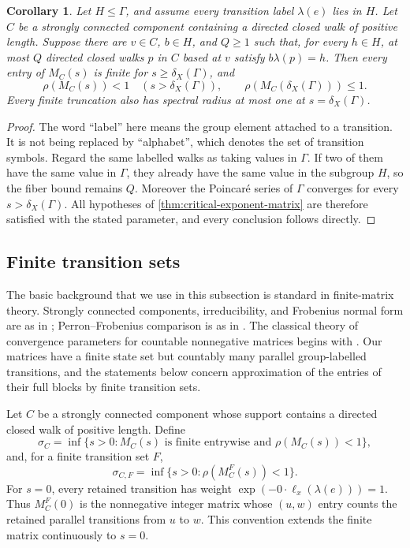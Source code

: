\documentclass[11pt]{article}
\newtheorem{corollary}[corollary]{Corollary}
\theoremstyle{definition}
\begin{document}
\begin{corollary}
\label{cor:finite-state-subgroup}
Let $H\le\Gamma$, and assume every transition label $\lambda(e)$ lies in $H$.  Let $C$ be a
strongly connected component containing a directed closed walk of positive length.  Suppose
there are $v\in C$, $b\in H$, and $Q\ge1$ such that, for every $h\in H$, at most $Q$
directed closed walks $p$ in $C$ based at $v$ satisfy $b\lambda(p)=h$.  Then every
entry of $M_C(s)$ is finite for $s\ge\delta_X(\Gamma)$, and
\[
 \rho(M_C(s))<1\quad(s>\delta_X(\Gamma)),
 \qquad
 \rho(M_C(\delta_X(\Gamma)))\le1.
\]
Every finite truncation also has spectral radius at most one at
$s=\delta_X(\Gamma)$.
\end{corollary}

\begin{proof}
The word ``label'' here means the group element attached to a transition. It is not being
replaced by ``alphabet'', which denotes the set of transition symbols.  Regard the same
labelled walks as taking values in $\Gamma$.  If two of them have the same value in
$\Gamma$, they already have the same value in the subgroup $H$, so the fiber bound remains
$Q$.  Moreover the Poincar\'e series of $\Gamma$ converges for every
$s>\delta_X(\Gamma)$.  All hypotheses of \cref{thm:critical-exponent-matrix} are therefore
satisfied with the stated parameter, and every conclusion follows directly.
\end{proof}

\subsection{Finite transition sets}
The basic background that we use in this subsection is standard in finite-matrix theory.  Strongly connected
components, irreducibility, and Frobenius normal form are as in
\cite[Theorems~3.2.1 and~3.2.4]{BrualdiRyser1991}; Perron--Frobenius comparison is as in
\cite[Chapter~1]{Seneta2006}.  The classical theory of convergence parameters for countable
nonnegative matrices begins with \cite[Sections~2--3]{VereJones1967}.  Our matrices have a
finite state set but countably many parallel group-labelled transitions, and the statements
below concern approximation of the entries of their full blocks by finite transition sets.

Let $C$ be a strongly connected component whose support contains a directed closed walk of
positive length.  Define
\[
 \sigma_C=
 \inf\{s>0:M_C(s)\text{ is finite entrywise and }\rho(M_C(s))<1\},
\]
and, for a finite transition set $F$,
\[
 \sigma_{C,F}=\inf\{s>0:\rho(M_C^F(s))<1\}.
\]
For $s=0$, every retained transition has weight
$\exp(-0\cdot\ell_x(\lambda(e)))=1$.  Thus $M_C^F(0)$ is the nonnegative integer matrix
whose $(u,w)$ entry counts the retained parallel transitions from $u$ to $w$. This convention
extends the finite matrix continuously to $s=0$.
\end{document}
